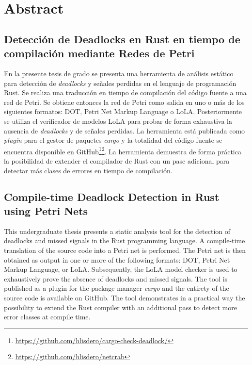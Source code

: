 \clearpage
{}
\chapter*{\centering Abstract}

\section*{Detección de Deadlocks en Rust en tiempo de compilación mediante Redes de Petri}

En la presente tesis de grado se presenta una herramienta de análisis estático
para detección de \textit{deadlocks} y señales perdidas en el lenguaje de programación Rust.
Se realiza una traducción en tiempo de compilación del código fuente a una red de Petri.
Se obtiene entonces la red de Petri como salida en uno o más de los siguientes formatos:
DOT, Petri Net Markup Language o \acrshort{LoLA}.
Posteriormente se utiliza el verificador de modelos \acrshort{LoLA}
para probar de forma exhaustiva la ausencia de \textit{deadlocks} y de señales perdidas.
La herramienta está publicada como \textit{plugin} para el gestor de paquetes \textit{cargo}
y la totalidad del código fuente se encuentra disponible
en GitHub\footnote{\url{https://github.com/hlisdero/cargo-check-deadlock/}}\footnote{\url{https://github.com/hlisdero/netcrab}}.
La herramienta demuestra de forma práctica la posibilidad
de extender el compilador de Rust con un pase adicional para
detectar más clases de errores en tiempo de compilación.

\section*{Compile-time Deadlock Detection in Rust using Petri Nets}

This undergraduate thesis presents a static analysis tool
for the detection of deadlocks and missed signals in the Rust programming language.
A compile-time translation of the source code into a Petri net is performed.
The Petri net is then obtained as output in one or more of the following formats:
DOT, Petri Net Markup Language, or \acrshort{LoLA}.
Subsequently, the \acrshort{LoLA} model checker is used
to exhaustively prove the absence of deadlocks and missed signals.
The tool is published as a plugin for the package manager \textit{cargo} and
the entirety of the source code is available on GitHub\footnotemark[1]\footnotemark[2].
The tool demonstrates in a practical way the possibility
to extend the Rust compiler with an additional pass
to detect more error classes at compile time.
